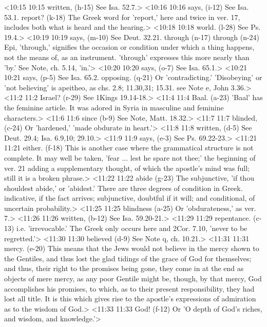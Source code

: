 <10:15 10:15  written, (h-15)  See Isa. 52.7.>
<10:16 10:16  says, (i-12)  See Isa. 53.1.
  report? (k-18)  The Greek word for 'report,' here and twice in ver. 17,  includes both what is heard and the hearing.>
<10:18 10:18  world. (l-28)  See Ps. 19.4.>
<10:19 10:19  says, (m-10)  See Deut. 32.21.
  through (n-17)  through (n-24)
  Epi, 'through,' signifies the occasion or condition under  which a thing happens, not the means of, as an instrument.  'through' expresses this more nearly than 'by.' See Note, ch.  5.14, 'in.'>
<10:20 10:20  says, (o-7)  See Isa. 65.1.>
<10:21 10:21  says, (p-5)  See Isa. 65.2.
  opposing. (q-21)  Or 'contradicting.' 'Disobeying' or 'not believing' is  apeitheo, as chs. 2.8; 11.30,31; 15.31. see Note e, John 3.36.>
<11:2 11:2  Israel? (r-29)  See 1Kings 19.14-18.>
<11:4 11:4  Baal. (a-23)  'Baal' has the feminine article. It was adored in Syria in  masculine and feminine characters.>
<11:6 11:6  since (b-9)  See Note, Matt. 18.32.>
<11:7 11:7  blinded, (c-24)  Or 'hardened,' 'made obdurate in heart.'>
<11:8 11:8  written, (d-5)  See Deut. 29.4; Isa. 6.9,10; 29.10.>
<11:9 11:9  says, (e-3)  See Ps. 69.22-23.>
<11:21 11:21  either. (f-18)  This is another case where the grammatical structure is not  complete. It may well be taken, 'fear ... lest he spare not  thee;' the beginning of ver. 21 adding a supplementary thought,  of which the apostle's mind was full; still it is a broken  phrase.>
<11:22 11:22  abide (g-23)  The subjunctive, 'if thou shouldest abide,' or 'abidest.'  There are three degrees of condition in Greek. indicative, if  the fact arrives; subjunctive, doubtful if it will; and  conditional, of uncertain probability.>
<11:25 11:25  blindness (a-25)  Or 'obdurateness,' as ver. 7.>
<11:26 11:26  written, (b-12)  See Isa. 59.20-21.>
<11:29 11:29  repentance. (c-13)  i.e. 'irrevocable.' The Greek only occurs here and 2Cor.  7.10, 'never to be regretted.'>
<11:30 11:30  believed (d-9)  See Note q, ch. 10.21.>
<11:31 11:31  mercy. (e-20)  This means that the Jews would not believe in the mercy shown  to the Gentiles, and thus lost the glad tidings of the grace of  God for themselves; and thus, their right to the promises being  gone, they come in at the end as objects of mere mercy, as any  poor Gentile might be, though, by that mercy, God accomplishes  his promises, to which, as to their present responsibility,  they had lost all title. It is this which gives rise to the  apostle's expressions of admiration as to the wisdom of God.>
<11:33 11:33  God! (f-12)  Or 'O depth of God's riches, and wisdom, and knowledge.'>
